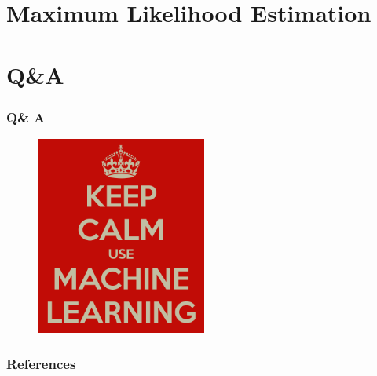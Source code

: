 \documentclass{beamer}
\begin{document}
\section{Maximum Likelihood Estimation}

\section{Q\&A}
\begin{frame}
  \frametitle{Q\& A}
  \begin{figure}
    \centering
    \includegraphics[width=0.5\textwidth]{machine_learning_logo.png}
  \end{figure}
\end{frame}

\begin{frame}[allowframebreaks]
\frametitle{References}
\footnotesize


\end{frame}
\end{document}
